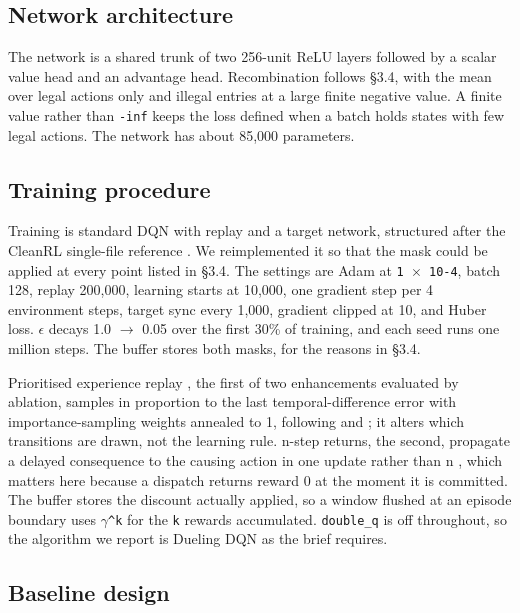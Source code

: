 \subsection{Network architecture}\label{network-architecture}

The network is a shared trunk of two 256-unit ReLU layers followed by a scalar value head and an
advantage head. Recombination follows §3.4, with the mean over legal actions only and illegal
entries at a large finite negative value. A finite value rather than \texttt{-inf} keeps the loss defined
when a batch holds states with few legal actions. The network has about 85,000 parameters.

\subsection{Training procedure}\label{training-procedure}

Training is standard DQN with replay and a target network, structured after the CleanRL single-file
reference \citep{huang2022cleanrl}. We reimplemented it so that the mask could
be applied at every point listed in §3.4. The settings are Adam at \texttt{1\ $\times$\ 10-4}, batch 128, replay 200,000,
learning starts at 10,000, one gradient step per 4 environment steps, target sync every 1,000,
gradient clipped at 10, and Huber loss. $\epsilon$ decays 1.0 $\rightarrow$ 0.05 over the first 30\% of training, and each
seed runs one million steps. The buffer stores both masks, for the reasons in §3.4.

Prioritised experience replay \citep{schaul2016per}, the first of two enhancements evaluated by
ablation, samples in proportion to the last temporal-difference error
with importance-sampling weights annealed to 1, following \citet{hanyang2020} and \citet{liu2025ddqnper}; it alters which transitions are drawn, not the learning rule. n-step returns, the second, propagate a delayed consequence to the causing action in one update rather than n \citep{hessel2018rainbow}, which
matters here because a dispatch returns reward 0 at the moment it is committed. The buffer stores
the discount actually applied, so a window flushed at an episode boundary uses \texttt{$\gamma$\^{}k} for the \texttt{k}
rewards accumulated. \texttt{double\_q} \citep{vanhasselt2016} is off throughout, so the algorithm we
report is Dueling DQN as the brief requires.

\subsection{Baseline design}\label{baseline-design}

